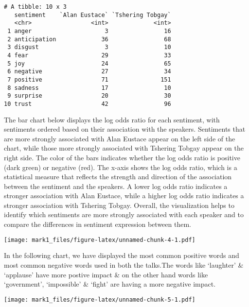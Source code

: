 \documentclass[
]{article}
\begin{document}
\begin{verbatim}
# A tibble: 10 x 3
   sentiment    `Alan Eustace` `Tshering Tobgay`
   <chr>                 <int>             <int>
 1 anger                     3                16
 2 anticipation             36                68
 3 disgust                   3                10
 4 fear                     29                33
 5 joy                      24                65
 6 negative                 27                34
 7 positive                 71               151
 8 sadness                  17                10
 9 surprise                 20                30
10 trust                    42                96
\end{verbatim}

The bar chart below displays the log odds ratio for each sentiment, with
sentiments ordered based on their association with the speakers.
Sentiments that are more strongly associated with Alan Eustace appear on
the left side of the chart, while those more strongly associated with
Tshering Tobgay appear on the right side. The color of the bars
indicates whether the log odds ratio is positive (dark green) or
negative (red). The x-axis shows the log odds ratio, which is a
statistical measure that reflects the strength and direction of the
association between the sentiment and the speakers. A lower log odds
ratio indicates a stronger association with Alan Eustace, while a higher
log odds ratio indicates a stronger association with Tshering Tobgay.
Overall, the visualization helps to identify which sentiments are more
strongly associated with each speaker and to compare the differences in
sentiment expression between them.

\texttt{[image: mark1\_files/figure-latex/unnamed-chunk-4-1.pdf]}

In the following chart, we have displayed the most common positive words
and most common negative words used in both the talks.The words like
`laughter' \& `applause' have more postive impact \& on the other hand
words like `government', `impossible' \& `fight' are having a more
negative impact.

\texttt{[image: mark1\_files/figure-latex/unnamed-chunk-5-1.pdf]}
\end{document}
